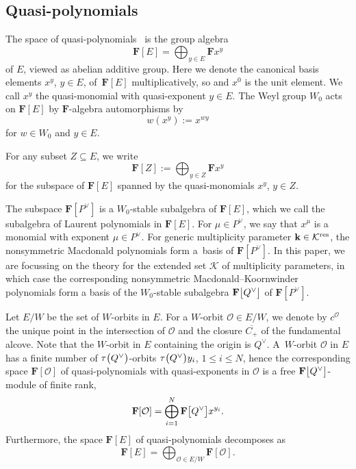 \documentclass[pdftex]{sigma}
\numberwithin{equation}{section}
\begin{document}
\subsection{Quasi-polynomials}%
The space of quasi-polynomials~\cite{SSV2} is the group algebra
\[
\mathbf{F}[E]=\bigoplus_{y\in E}\mathbf{F}x^y
\]
of $E$, viewed as abelian additive group. Here we denote the canonical basis elements $x^y$, ${y\in E}$, of~$\mathbf{F}[E]$ multiplicatively, so  and $x^0$ is the unit element. We call $x^y$ the quasi-monomial with quasi-exponent $y\in E$. The Weyl group $W_0$ acts on $\mathbf{F}[E]$
by $\mathbf{F}$-algebra automorphisms by
\[
w(x^y):=x^{wy}
\]
for $w\in W_0$ and $y\in E$.

For any subset $Z\subseteq E$, we write
\[
\mathbf{F}[Z]:=\bigoplus_{y\in Z}\mathbf{F}x^y
\]
for the subspace of $\mathbf{F}[E]$ spanned by the quasi-monomials $x^y$, $y\in Z$.

The subspace $\mathbf{F}[P^\vee]$ is a $W_0$-stable subalgebra of $\mathbf{F}[E]$, which we call the subalgebra of Laurent polynomials in $\mathbf{F}[E]$. For $\mu\in P^\vee$, we say that $x^\mu$ is a monomial with exponent $\mu\in P^\vee$.
For generic multiplicity parameter $\mathbf{k}\in\mathcal{K}^{{\rm res}}$, the nonsymmetric Macdonald polynomials form a~basis of $\mathbf{F}[P^\vee]$.
In this paper, we are focussing on the theory for the extended set $\mathcal{K}$ of multiplicity parameters, in which case the corresponding nonsymmetric Macdonald--Koornwinder polynomials form a basis of the $W_0$-stable subalgebra $\mathbf{F}\smash{\bigl[Q^\vee\bigr]}$ of $\mathbf{F}[P^\vee]$.

Let $E/W$ be the set of $W$-orbits in $E$. For a $W$-orbit $\mathcal{O}\in E/W$, we denote by $c^{\mathcal{O}}$ the unique point in the intersection of $\mathcal{O}$
and the closure $\overline{C_+}$ of the fundamental alcove. Note that the $W$-orbit in $E$ containing the origin is $Q^\vee$.
A~$W$-orbit $\mathcal{O}$ in $E$ has a finite number of $\tau\smash{\bigl(Q^\vee\bigr)}$-orbits $\tau\smash{\bigl(Q^\vee\bigr)}y_i$, $1\leq i\leq N$, hence the corresponding space $\mathbf{F}[\mathcal{O}]$ of quasi-polynomials with quasi-exponents in $\mathcal{O}$ is a free $\mathbf{F}\smash{\bigl[Q^\vee\bigr]}$-module of finite rank,
\begin{equation}\label{FOpoldec}
\mathbf{F}[\mathcal{O}]=\bigoplus_{i=1}^N\mathbf{F}\smash{\bigl[Q^\vee\bigr]}x^{y_i}.
\end{equation}
Furthermore, the
space $\mathbf{F}[E]$ of quasi-polynomials decomposes as
\begin{equation}\label{Porbit}
\mathbf{F}[E]=\bigoplus_{\mathcal{O}\in E/W}\mathbf{F}[\mathcal{O}].
\end{equation}
\end{document}
